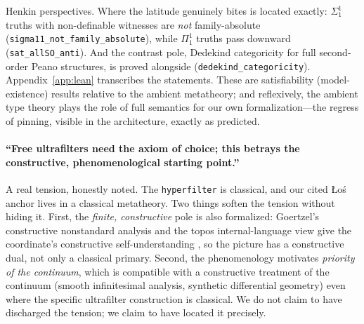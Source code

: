 \documentclass[]{article}
\theoremstyle{definition}
\theoremstyle{remark}
\newcommand{\code}[1]{\texttt{#1}}
\begin{document}
Henkin perspectives. Where the latitude genuinely bites is located exactly:
$\Sigma^1_1$ truths with non-definable witnesses are \emph{not} family-absolute
(\code{sigma11\_not\_family\_absolute}), while $\Pi^1_1$ truths pass downward
(\code{sat\_allSO\_anti}). And the contrast pole, Dedekind categoricity for full
second-order Peano structures, is proved alongside (\code{dedekind\_categoricity}). Appendix~\ref{app:lean} transcribes the
statements. These are satisfiability (model-existence) results relative to the
ambient metatheory; and reflexively, the ambient type theory plays the role of full
semantics for our own formalization---the regress of pinning, visible in the
architecture, exactly as predicted.

\paragraph{``Free ultrafilters need the axiom of choice; this betrays the
constructive, phenomenological starting point.''} A real tension, honestly noted.
The \code{hyperfilter} is classical, and our cited {\L}o\'s anchor lives in a
classical metatheory. Two things soften the tension without hiding it. First, the
\emph{finite, constructive} pole is also formalized: Goertzel's constructive
nonstandard analysis and the topos internal-language view give the coordinate's
constructive self-understanding \cite{GoertzelHyperseed, MacLaneMoerdijk1992}, so
the picture has a constructive dual, not only a classical primary. Second, the
phenomenology motivates \emph{priority of the continuum}, which is compatible with
a constructive treatment of the continuum (smooth infinitesimal analysis, synthetic
differential geometry) even where the specific ultrafilter construction is
classical. We do not claim to have discharged the tension; we claim to have located
it precisely.
\end{document}
